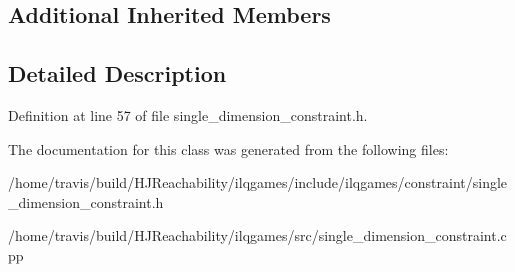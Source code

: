 \subsection*{Additional Inherited Members}


\subsection{Detailed Description}


Definition at line 57 of file single\+\_\+dimension\+\_\+constraint.\+h.



The documentation for this class was generated from the following files\+:\begin{DoxyCompactItemize}
\item 
/home/travis/build/\+H\+J\+Reachability/ilqgames/include/ilqgames/constraint/single\+\_\+dimension\+\_\+constraint.\+h\item 
/home/travis/build/\+H\+J\+Reachability/ilqgames/src/single\+\_\+dimension\+\_\+constraint.\+cpp\end{DoxyCompactItemize}
